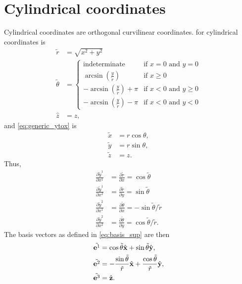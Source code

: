 \documentclass[11pt]{article}
\newcommand{\xtilde}{\tilde{x}}
\newcommand{\ytilde}{\tilde{y}}
\newcommand{\ztilde}{\tilde{z}}
\newcommand{\rtilde}{\tilde{r}}
\newcommand{\thetatilde}{\tilde{\theta}}
\begin{document}
\section{Cylindrical coordinates}
Cylindrical coordinates are orthogonal curvilinear coordinates.  for cylindrical coordinates is
\begin{align}
    \rtilde &= \sqrt{x^2 + y^2} \\
    \thetatilde &= {\begin{cases}{\text{indeterminate}}&{\text{if }}x=0{\text{ and }}y=0\\\arcsin \left({\frac {y}{\rtilde }}\right)&{\text{if }}x\geq 0\\-\arcsin \left({\frac {y}{\rtilde }}\right)+\pi &{\mbox{if }}x<0{\text{ and }}y\geq 0\\-\arcsin \left({\frac {y}{\rtilde }}\right)-\pi &{\mbox{if }}x<0{\text{ and }}y<0\end{cases}} \\
    \hat{z} & = z,
\end{align}
and \cref{eq:generic_ytox} is 
\begin{align}
    \xtilde &= r \cos \theta, \\
    \ytilde &= r \sin \theta, \\
    \ztilde &= z.
\end{align}
Thus, 
\begin{align}
    \frac{\partial \ytilde^1}{\partial x^1} &= \frac{\partial \rtilde}{\partial x} = \cos \thetatilde \\
    \frac{\partial \ytilde^1}{\partial x^2} &= \frac{\partial \rtilde}{\partial y} = \sin \thetatilde \\
    \frac{\partial \ytilde^2}{\partial x^1} &= \frac{\partial \thetatilde}{\partial x} = -\sin \thetatilde / \rtilde \\
    \frac{\partial \ytilde^2}{\partial x^2} &= \frac{\partial \thetatilde}{\partial y} = \cos \thetatilde / \rtilde.
\end{align}
The basis vectors as defined in \cref{eq:basis_sup} are then 
\begin{align}
    \tilde{\evec^{1}} &= \cos \thetatilde \hat{\xvec} + \sin \thetatilde \hat{\yvec}, \\
    \tilde{\evec^{2}} &= -\frac{\sin \thetatilde}{\rtilde} \hat{\xvec} + \frac{\cos \thetatilde}{\rtilde} \hat{\yvec},  \\
    \tilde{\evec^{3}} &= \hat{\zvec}. 
\end{align}
\end{document}

